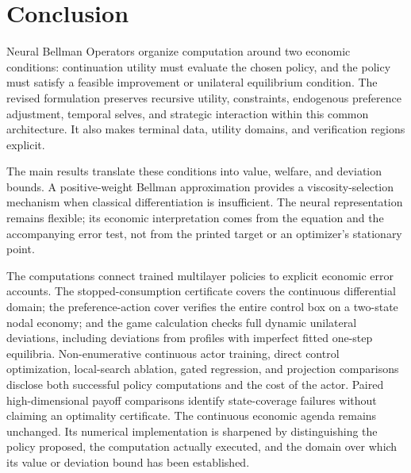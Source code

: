 \documentclass[ecta,draft]{econsocart}
\theoremstyle{definition}
\theoremstyle{remark}
\begin{document}
\section{Conclusion}\label{sec:conclusion}
Neural Bellman Operators organize computation around two economic conditions: continuation utility must evaluate the chosen policy, and the policy must satisfy a feasible improvement or unilateral equilibrium condition. The revised formulation preserves recursive utility, constraints, endogenous preference adjustment, temporal selves, and strategic interaction within this common architecture. It also makes terminal data, utility domains, and verification regions explicit.

The main results translate these conditions into value, welfare, and deviation bounds. A positive-weight Bellman approximation provides a viscosity-selection mechanism when classical differentiation is insufficient. The neural representation remains flexible; its economic interpretation comes from the equation and the accompanying error test, not from the printed target or an optimizer's stationary point.

The computations connect trained multilayer policies to explicit economic error accounts. The stopped-consumption certificate covers the continuous differential domain; the preference-action cover verifies the entire control box on a two-state nodal economy; and the game calculation checks full dynamic unilateral deviations, including deviations from profiles with imperfect fitted one-step equilibria. Non-enumerative continuous actor training, direct control optimization, local-search ablation, gated regression, and projection comparisons disclose both successful policy computations and the cost of the actor. Paired high-dimensional payoff comparisons identify state-coverage failures without claiming an optimality certificate. The continuous economic agenda remains unchanged. Its numerical implementation is sharpened by distinguishing the policy proposed, the computation actually executed, and the domain over which its value or deviation bound has been established.
\end{document}
